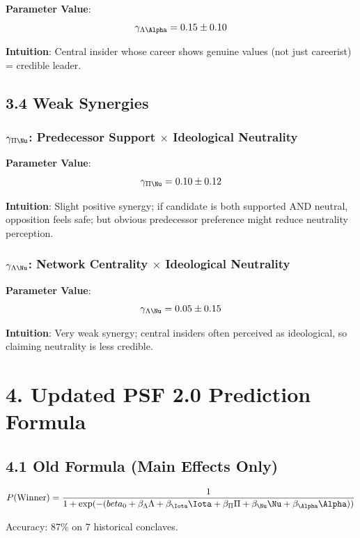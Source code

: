 \documentclass[11pt]{article}
\begin{document}
\textbf{Parameter Value}:
$$\gamma_{\Lambda\Alpha} = 0.15 \pm 0.10$$

\textbf{Intuition}: Central insider whose career shows genuine values (not just careerist) = credible leader.

\subsection{3.4 Weak Synergies}

\subsubsection{$\gamma_{\Pi\Nu}$: Predecessor Support $\times$ Ideological Neutrality}

\textbf{Parameter Value}:
$$\gamma_{\Pi\Nu} = 0.10 \pm 0.12$$

\textbf{Intuition}: Slight positive synergy; if candidate is both supported AND neutral, opposition feels safe; but obvious predecessor preference might reduce neutrality perception.

\subsubsection{$\gamma_{\Lambda\Nu}$: Network Centrality $\times$ Ideological Neutrality}

\textbf{Parameter Value}:
$$\gamma_{\Lambda\Nu} = 0.05 \pm 0.15$$

\textbf{Intuition}: Very weak synergy; central insiders often perceived as ideological, so claiming neutrality is less credible.

\section{4. Updated PSF 2.0 Prediction Formula}

\subsection{4.1 Old Formula (Main Effects Only)}

\begin{equation}
P(\text{Winner}) = \frac{1}{1 + \exp(-(\\beta_0 + \beta_\Lambda \Lambda + \beta_\Iota \Iota + \beta_\Pi \Pi + \beta_\Nu \Nu + \beta_\Alpha \Alpha))}
\end{equation}

Accuracy: 87\% on 7 historical conclaves.
\end{document}
